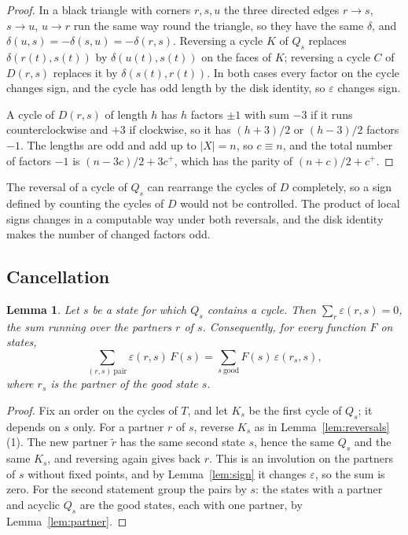 \documentclass[10pt]{amsart}
\numberwithin{equation}{section}
\newtheorem{lemma}[equation]{Lemma}
\theoremstyle{definition}
\theoremstyle{remark}
\newcommand{\T}{T}
\newcommand{\eps}{\varepsilon}
\begin{document}
\begin{proof}
In a black triangle with corners $r,s,u$ the three directed edges $r\to s$, $s\to u$, $u\to r$ run the same way round the triangle, so they have the same $\delta$, and $\delta(u,s)=-\delta(s,u)=-\delta(r,s)$.
Reversing a cycle $K$ of $Q_s$ replaces $\delta(r(t),s(t))$ by $\delta(u(t),s(t))$ on the faces of $K$; reversing a cycle $C$ of $D(r,s)$ replaces it by $\delta(s(t),r(t))$.
In both cases every factor on the cycle changes sign, and the cycle has odd length by the disk identity, so $\eps$ changes sign.

A cycle of $D(r,s)$ of length $h$ has $h$ factors $\pm1$ with sum $-3$ if it runs counterclockwise and $+3$ if clockwise, so it has $(h+3)/2$ or $(h-3)/2$ factors $-1$.
The lengths are odd and add up to $|X|=n$, so $c\equiv n$, and the total number of factors $-1$ is $(n-3c)/2+3c^+$, which has the parity of $(n+c)/2+c^+$.
\end{proof}

The reversal of a cycle of $Q_s$ can rearrange the cycles of $D$ completely, so a sign defined by counting the cycles of $D$ would not be controlled.
The product of local signs changes in a computable way under both reversals, and the disk identity makes the number of changed factors odd.

\subsection*{Cancellation}

\begin{lemma}\label{lem:cancel}
Let $s$ be a state for which $Q_s$ contains a cycle.
Then $\sum_r\eps(r,s)=0$, the sum running over the partners $r$ of $s$.
Consequently, for every function $F$ on states,
\[
\sum_{(r,s)\ \text{pair}}\eps(r,s)\,F(s)=\sum_{s\ \text{good}}F(s)\,\eps(r_s,s),
\]
where $r_s$ is the partner of the good state $s$.
\end{lemma}

\begin{proof}
Fix an order on the cycles of $\T$, and let $K_s$ be the first cycle of $Q_s$; it depends on $s$ only.
For a partner $r$ of $s$, reverse $K_s$ as in Lemma~\ref{lem:reversals}(1).
The new partner $\tilde r$ has the same second state $s$, hence the same $Q_s$ and the same $K_s$, and reversing again gives back $r$.
This is an involution on the partners of $s$ without fixed points, and by Lemma~\ref{lem:sign} it changes $\eps$, so the sum is zero.
For the second statement group the pairs by $s$: the states with a partner and acyclic $Q_s$ are the good states, each with one partner, by Lemma~\ref{lem:partner}.
\end{proof}
\end{document}
